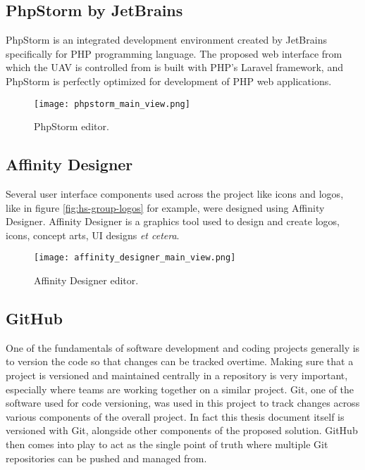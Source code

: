 \subsection{PhpStorm by JetBrains}
\label{subsec:phpstorm}

PhpStorm is an integrated development environment created by JetBrains specifically for PHP programming language. The proposed web interface from which the UAV is controlled from is built with PHP's Laravel framework, and PhpStorm is perfectly optimized for development of PHP web applications.

\begin{figure}[H]
    \centering \texttt{[image: phpstorm\_main\_view.png]}
    \caption{PhpStorm editor.}
    \label{fig:phpstorm}
\end{figure}




\subsection{Affinity Designer}
\label{subsec:affinity-designer}

Several user interface components used across the project like icons and logos, like in figure \ref{fig:hs-group-logos} for example, were designed using Affinity Designer. Affinity Designer is a graphics tool used to design and create logos, icons, concept arts, UI designs \textit{et cetera}.

\begin{figure}[H]
    \centering \texttt{[image: affinity\_designer\_main\_view.png]}
    \caption{Affinity Designer editor.}
    \label{fig:affinity-designer}
\end{figure}




\subsection{GitHub}
\label{subsec:github}

One of the fundamentals of software development and coding projects generally is to version the code so that changes can be tracked overtime. Making sure that a project is versioned and maintained centrally in a repository is very important, especially where teams are working together on a similar project. Git, one of the software used for code versioning, was used in this project to track changes across various components of the overall project. In fact this thesis document itself is versioned with Git, alongside other components of the proposed solution. GitHub then comes into play to act as the single point of truth where multiple Git repositories can be pushed and managed from.

